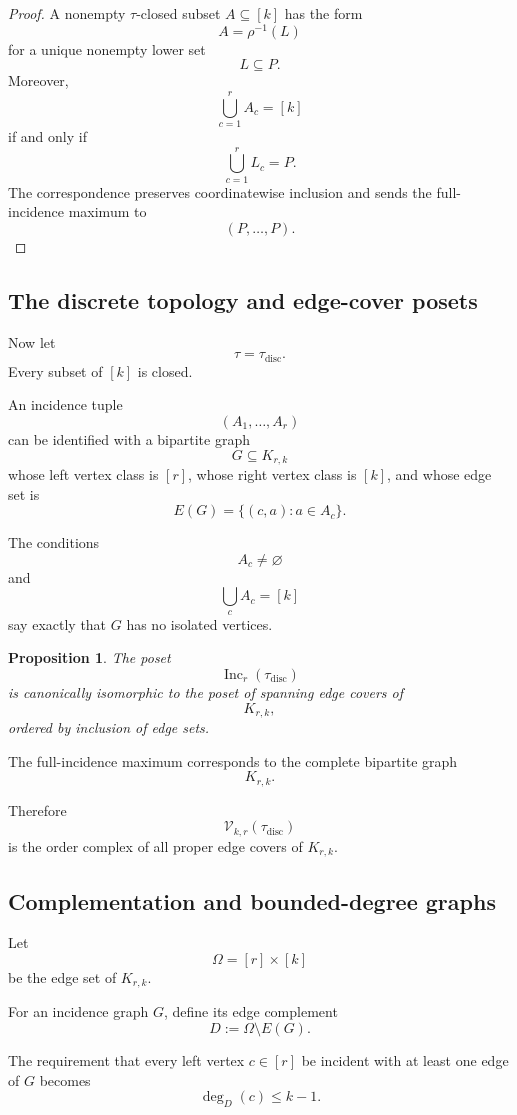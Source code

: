 \documentclass[11pt]{article}
\theoremstyle{plain}
\newtheorem{proposition}[theorem]{Proposition}
\theoremstyle{definition}
\begin{document}
\begin{proof}
A nonempty $\tau$-closed subset $A\subseteq[k]$ has the form
\[
A=\rho^{-1}(L)
\]
for a unique nonempty lower set
\[
L\subseteq P.
\]
Moreover,
\[
\bigcup_{c=1}^rA_c=[k]
\]
if and only if
\[
\bigcup_{c=1}^rL_c=P.
\]
The correspondence preserves coordinatewise inclusion and sends the
full-incidence maximum to
\[
(P,\ldots,P).
\]
\end{proof}


\subsection{The discrete topology and edge-cover posets}
\label{subsec:discrete-edge-covers}

Now let
\[
\tau=\tau_{\mathrm{disc}}.
\]
Every subset of $[k]$ is closed.

An incidence tuple
\[
(A_1,\ldots,A_r)
\]
can be identified with a bipartite graph
\[
G\subseteq K_{r,k}
\]
whose left vertex class is $[r]$, whose right vertex class is $[k]$, and
whose edge set is
\[
E(G)
=
\{(c,a):a\in A_c\}.
\]

The conditions
\[
A_c\neq\varnothing
\]
and
\[
\bigcup_cA_c=[k]
\]
say exactly that $G$ has no isolated vertices.

\begin{proposition}
\label{prop:discrete-inc-edge-cover}
The poset
\[
\operatorname{Inc}_r(\tau_{\mathrm{disc}})
\]
is canonically isomorphic to the poset of spanning edge covers of
\[
K_{r,k},
\]
ordered by inclusion of edge sets.
\end{proposition}

The full-incidence maximum corresponds to the complete bipartite graph
\[
K_{r,k}.
\]

Therefore
\[
\mathcal V_{k,r}(\tau_{\mathrm{disc}})
\]
is the order complex of all proper edge covers of $K_{r,k}$.

\subsection{Complementation and bounded-degree graphs}
\label{subsec:complement-bounded-degree}

Let
\[
\Omega=[r]\times[k]
\]
be the edge set of $K_{r,k}$.

For an incidence graph $G$, define its edge complement
\[
D
:=
\Omega\setminus E(G).
\]

The requirement that every left vertex $c\in[r]$ be incident with at
least one edge of $G$ becomes
\[
\deg_D(c)\leq k-1.
\]
\end{document}
